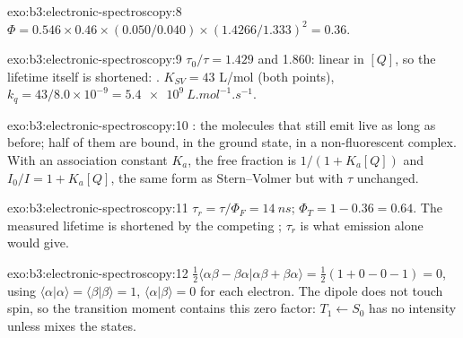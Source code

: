 \begin{solution}{exo:b3:electronic-spectroscopy:8}
$\Phi = 0.546 \times 0.46 \times (0.050/0.040) \times (1.4266/1.333)^2 = 0.36$.
\end{solution}

\begin{solution}{exo:b3:electronic-spectroscopy:9}
$\tau_0/\tau = 1.429$ and 1.860: linear in $[Q]$, so the lifetime itself is
shortened: . $K_{SV} = 43$ L/mol (both points), $k_q = 43/8.0
\times 10^{-9} = \qty{5.4e9}{L.mol^{-1}.s^{-1}}$.
\end{solution}

\begin{solution}{exo:b3:electronic-spectroscopy:10}
: the molecules that still emit live as long as before; half of
them are bound, in the ground state, in a non-fluorescent complex. With an
association constant $K_a$, the free fraction is $1/(1 + K_a[Q])$ and $I_0/I = 1 +
K_a[Q]$, the same form as Stern--Volmer but with $\tau$ unchanged.
\end{solution}

\begin{solution}{exo:b3:electronic-spectroscopy:11}
$\tau_r = \tau/\Phi_F = \qty{14}{ns}$; $\Phi_T = 1 - 0.36 = 0.64$. The measured lifetime is
shortened by the competing ; $\tau_r$ is what emission alone
would give.
\end{solution}

\begin{solution}{exo:b3:electronic-spectroscopy:12}
$\frac12\langle\alpha\beta - \beta\alpha|\alpha\beta + \beta\alpha\rangle = \frac12(1 + 0 - 0 - 1) = 0$, using
$\langle\alpha|\alpha\rangle = \langle\beta|\beta\rangle = 1$, $\langle\alpha|\beta\rangle = 0$ for each electron.
The dipole  does not touch spin, so the transition moment contains this
zero factor: $T_1 \leftarrow S_0$ has no intensity unless  mixes
the states.
\end{solution}

